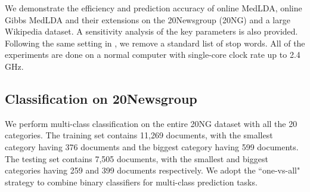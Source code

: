 \documentclass[twoside,11pt]{article}
\begin{document}
We demonstrate the efficiency and prediction accuracy of online MedLDA, online Gibbs MedLDA and their extensions on the 20Newsgroup (20NG) and a large Wikipedia dataset. A sensitivity analysis of the key parameters is also provided. Following the same setting in \cite{zhu2012medlda}, we remove a standard list of stop words. All of the experiments are done on a normal computer with single-core clock rate up to 2.4 GHz.


\subsection{Classification on 20Newsgroup}
\label{sec:mc}

We perform multi-class classification on the entire 20NG dataset with all the 20 categories. The training set contains 11,269 documents, with the smallest category having 376 documents and the biggest category having 599 documents. The testing set contains 7,505 documents, with the smallest and biggest categories having 259 and 399 documents respectively. We adopt the ``one-vs-all" strategy \citep{rifkin2004defense} to combine binary classifiers for multi-class prediction tasks.
\end{document}
